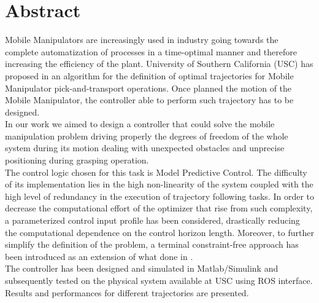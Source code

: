 	\newpage
\chapter*{Abstract}

Mobile Manipulators are increasingly used in industry going towards the complete automatization of processes in a time-optimal manner and therefore increasing the efficiency of the plant. University of Southern California (USC) has proposed in \cite{shantanuthakar} an algorithm for the definition of optimal trajectories for Mobile Manipulator pick-and-transport operations. Once planned the motion of the Mobile Manipulator, the controller able to perform such trajectory has to be designed. \\
In our work we aimed to design a controller that could solve the mobile manipulation problem driving properly the degrees of freedom of the whole system during its motion dealing with unexpected obstacles and unprecise positioning during grasping operation.\\
The control logic chosen for this task is Model Predictive Control. The difficulty of its implementation lies in the high non-linearity of the system coupled with the high level of redundancy in the execution of trajectory following tasks. In order to decrease the computational effort of the optimizer that rise from such complexity, a parameterized control input profile has been considered, drastically reducing the computational dependence on the control horizon length. Moreover, to further simplify the definition of the problem, a terminal constraint-free approach has been introduced as an extension of what done in \cite{alamir2018stability}. \\
The controller has been designed and simulated in Matlab/Simulink and subsequently tested on the physical system available at USC using ROS interface. Results and performances for different trajectories are presented.  

\vspace{0.5cm}
\noindent 
